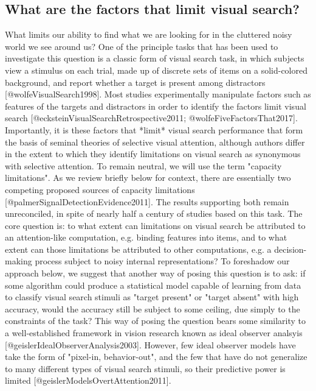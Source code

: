 \documentclass[10pt,letterpaper]{article}
\begin{document}
\subsection{What are the factors that limit visual search?}
What limits our ability to find what we are looking for in the cluttered noisy world we 
see around us? One of the principle tasks that has been used to investigate this question
is a classic form of visual search task, in which subjects view a stimulus on each trial, 
made up of discrete sets of items on a solid-colored background, and report whether a 
target is present among distractors [@wolfeVisualSearch1998]. 
Most studies experimentally manipulate factors such as features of the targets and 
distractors in order to identify the factors limit visual search 
[@ecksteinVisualSearchRetrospective2011; @wolfeFiveFactorsThat2017].
Importantly, it is these factors that *limit* visual search performance that form the 
basis of seminal theories of selective visual attention, although authors differ in the 
extent to which they identify limitations on visual search as synonymous with selective 
attention. To remain neutral, we will use the term "capacity limitations". 
As we review briefly below for context, there are essentially two competing proposed 
sources of capacity limitations [@palmerSignalDetectionEvidence2011]. 
The results supporting both remain unreconciled, in spite of nearly half a century of 
studies based on this task. The core question is: to 
what extent can limitations on visual search be attributed to an attention-like 
computation, e.g. binding features into items, and to what extent can those limitations be 
attributed to other computations, e.g. a decision-making process subject to  
noisy internal representations?
To foreshadow our approach below, we suggest that another way of posing this question is 
to ask: if some algorithm could produce a statistical model capable of learning from data 
to classify visual search stimuli as "target present" or "target absent" with high 
accuracy, would the accuracy still be subject to some ceiling, due simply to the 
constraints of the task? This way of posing the question bears some similarity to a 
well-established framework in vision research known as ideal observer analsyis 
[@geislerIdealObserverAnalysis2003]. However, few ideal observer models have take the 
form of "pixel-in, behavior-out", and the few that have do not generalize to many 
different types of visual search stimuli, so their predictive power is limited 
[@geislerModelsOvertAttention2011].
\end{document}
